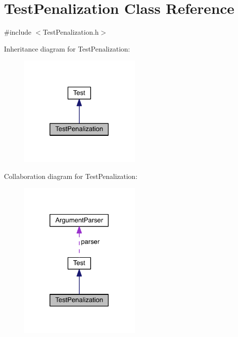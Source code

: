 \hypertarget{class_test_penalization}{}\section{Test\+Penalization Class Reference}
\label{class_test_penalization}


{\ttfamily \#include $<$Test\+Penalization.\+h$>$}



Inheritance diagram for Test\+Penalization\+:\nopagebreak
\begin{figure}[H]
\begin{center}
\leavevmode
\includegraphics[width=169pt]{d8/d68/class_test_penalization__inherit__graph}
\end{center}
\end{figure}


Collaboration diagram for Test\+Penalization\+:\nopagebreak
\begin{figure}[H]
\begin{center}
\leavevmode
\includegraphics[width=169pt]{d9/d87/class_test_penalization__coll__graph}
\end{center}
\end{figure}
